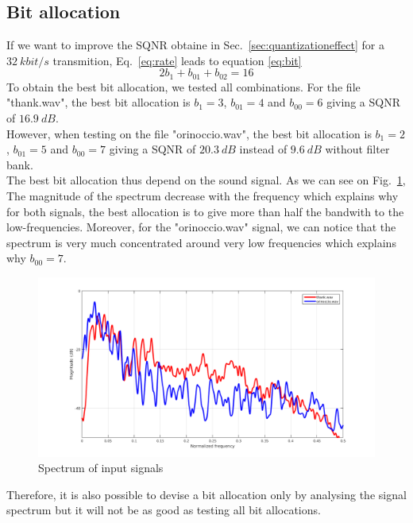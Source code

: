 \documentclass[a4paper,twocolumn]{article}
\begin{document}
\subsection{Bit allocation}
If we want to improve the SQNR obtaine in Sec.~\ref{sec:quantizationeffect} for a $32~kbit/s$ transmition, Eq.~\ref{eq:rate} leads to equation \ref{eq:bit}
\begin{equation}
  \label{eq:bit}
  2b_{1}+b_{01}+b_{02}=16
\end{equation}
To obtain the best bit allocation, we tested all combinations. For the file "thank.wav", the best bit allocation is $b_{1}=3$, $b_{01}=4$ and $b_{00}=6$ giving a SQNR of $16.9~dB$.\\

However, when testing on the file "orinoccio.wav", the best bit allocation is $b_{1}=2$, $b_{01}=5$ and $b_{00}=7$ giving a SQNR of $20.3~dB$ instead of $9.6~dB$ without filter bank.\\

The best bit allocation thus depend on the sound signal. As we can see on Fig.~\ref{fig:spectrum}, The magnitude of the spectrum decrease with the frequency which explains why for both signals, the best allocation is to give more than half the bandwith to the low-frequencies. Moreover, for the "orinoccio.wav" signal, we can notice that the spectrum is very much concentrated around very low frequencies which explains why $b_{00}=7$.
\begin{figure}[!ht]
  \begin{center}
    \includegraphics[width=1.1\columnwidth]{spectrum3.png}
  \end{center}
  \caption{Spectrum of input signals}
  \label{fig:spectrum}
\end{figure}
Therefore, it is also possible to devise a bit allocation only by analysing the signal spectrum but it will not be as good as testing all bit allocations.
\end{document}
